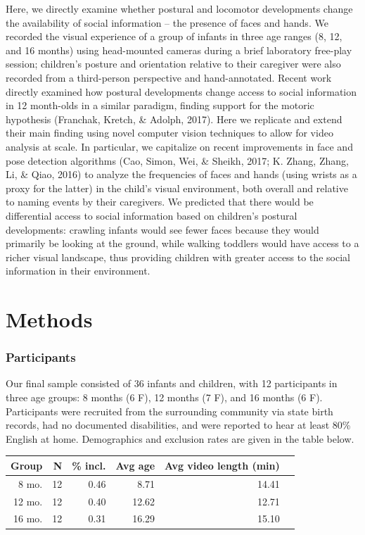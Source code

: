 \documentclass[10pt, letterpaper]{article}
\begin{document}
Here, we directly examine whether postural and locomotor developments
change the availability of social information -- the presence of faces
and hands. We recorded the visual experience of a group of infants in
three age ranges (8, 12, and 16 months) using head-mounted cameras
during a brief laboratory free-play session; children's posture and
orientation relative to their caregiver were also recorded from a
third-person perspective and hand-annotated. Recent work directly
examined how postural developments change access to social information
in 12 month-olds in a similar paradigm, finding support for the motoric
hypothesis (Franchak, Kretch, \& Adolph, 2017). Here we replicate and
extend their main finding using novel computer vision techniques to
allow for video analysis at scale. In particular, we capitalize on
recent improvements in face and pose detection algorithms (Cao, Simon,
Wei, \& Sheikh, 2017; K. Zhang, Zhang, Li, \& Qiao, 2016) to analyze the
frequencies of faces and hands (using wrists as a proxy for the latter)
in the child's visual environment, both overall and relative to naming
events by their caregivers. We predicted that there would be
differential access to social information based on children's postural
developments: crawling infants would see fewer faces because they would
primarily be looking at the ground, while walking toddlers would have
access to a richer visual landscape, thus providing children with
greater access to the social information in their environment.

\section{Methods}\label{methods}

\subsubsection{Participants}\label{participants}

Our final sample consisted of 36 infants and children, with 12
participants in three age groups: 8 months (6 F), 12 months (7 F), and
16 months (6 F). Participants were recruited from the surrounding
community via state birth records, had no documented disabilities, and
were reported to hear at least 80\% English at home. Demographics and
exclusion rates are given in the table below.

\begin{table}[ht]
\centering
\begin{tabular}{rrrrrr}
\hline
Group & N & \% incl. & Avg age & Avg video length (min) \\ 
\hline
8 mo. &   12 & 0.46 & 8.71 & 14.41 \\ 
12 mo. &  12 & 0.40 & 12.62 & 12.71 \\ 
16 mo. &  12 & 0.31 & 16.29 & 15.10\\ 
\hline
\end{tabular}
\end{table}
\end{document}
